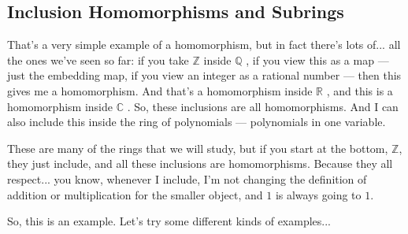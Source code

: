 \begin{hidden}
\end{hidden}

\subsection{Inclusion Homomorphisms and Subrings}

\begin{speech}[00:27:20 - 00:28:24]
That's a very simple example of a homomorphism, but in fact there's lots of... all the ones we've seen so far: if you take $\mathbb{Z}$ inside $\mathbb{Q}$ , if you view this as a map --- just the embedding map, if you view an integer as a rational number --- then this gives me a homomorphism. And that's a homomorphism inside $\mathbb{R}$ , and this is a homomorphism inside $\mathbb{C}$ . So, these inclusions are all homomorphisms. And I can also include this inside the ring of polynomials  --- polynomials in one variable.

These are many of the rings that we will study, but if you start at the bottom, $\mathbb{Z}$, they just include, and all these inclusions are homomorphisms. Because they all respect... you know, whenever I include, I'm not changing the definition of addition or multiplication for the smaller object, and $1$ is always going to $1$.

So, this is an example. Let's try some different kinds of examples... 
\end{speech}

\begin{content}
\end{content}

